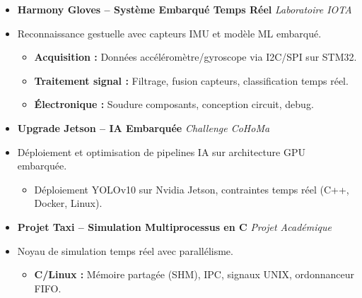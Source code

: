 \documentclass[a4paper,11pt]{article}
\begin{document}
\begin{itemize}[leftmargin=*, label={}]
\item \textbf{Harmony Gloves -- Système Embarqué Temps Réel} \hfill \textit{Laboratoire IOTA}
\vspace{-2pt}
\item \small{Reconnaissance gestuelle avec capteurs IMU et modèle ML embarqué.}
    \begin{itemize}[leftmargin=0.4cm, nosep, label=\tiny$\bullet$]
        \item \small{\textbf{Acquisition :} Données accéléromètre/gyroscope via I2C/SPI sur STM32.}
        \item \small{\textbf{Traitement signal :} Filtrage, fusion capteurs, classification temps réel.}
        \item \small{\textbf{Électronique :} Soudure composants, conception circuit, debug.}
    \end{itemize}
    \vspace{3pt}

\item \textbf{Upgrade Jetson -- IA Embarquée} \hfill \textit{Challenge CoHoMa}
\vspace{-2pt}
\item \small{Déploiement et optimisation de pipelines IA sur architecture GPU embarquée.}
    \begin{itemize}[leftmargin=0.4cm, nosep, label=\tiny$\bullet$]
        \item \small{Déploiement YOLOv10 sur Nvidia Jetson, contraintes temps réel (C++, Docker, Linux).}
    \end{itemize}
    \vspace{3pt}

\item \textbf{Projet Taxi -- Simulation Multiprocessus en C} \hfill \textit{Projet Académique}
\vspace{-2pt}
\item \small{Noyau de simulation temps réel avec parallélisme.}
    \begin{itemize}[leftmargin=0.4cm, nosep, label=\tiny$\bullet$]
        \item \small{\textbf{C/Linux :} Mémoire partagée (SHM), IPC, signaux UNIX, ordonnanceur FIFO.}
    \end{itemize}

\end{itemize}

\end{document}
